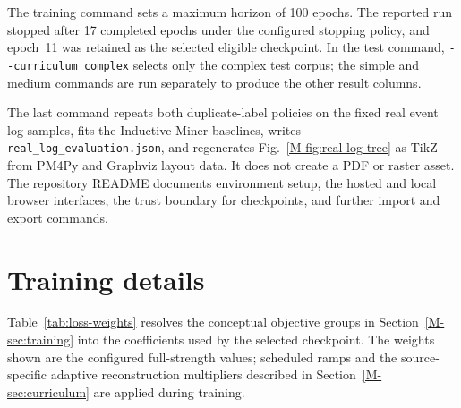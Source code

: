\documentclass[applsci,supfile,submit,pdftex,moreauthors]{Definitions/mdpi}
\begin{document}
The training command sets a maximum horizon of 100 epochs. The reported run stopped after 17 completed epochs under the configured stopping policy, and epoch~11 was retained as the selected eligible checkpoint. In the test command, \texttt{-{}-curriculum complex} selects only the complex test corpus; the simple and medium commands are run separately to produce the other result columns.

The last command repeats both duplicate-label policies on the fixed real event log samples, fits the Inductive Miner baselines, writes \texttt{real\_log\_evaluation.json}, and regenerates Fig.~\ref{M-fig:real-log-tree} as TikZ from PM4Py and Graphviz layout data. It does not create a PDF or raster asset. The repository README documents environment setup, the hosted and local browser interfaces, the trust boundary for checkpoints, and further import and export commands.

\FloatBarrier

\FloatBarrier

\section{Training details}\label{app:training-details}

Table~\ref{tab:loss-weights} resolves the conceptual objective groups in Section~\ref{M-sec:training} into the coefficients used by the selected checkpoint. The weights shown are the configured full-strength values; scheduled ramps and the source-specific adaptive reconstruction multipliers described in Section~\ref{M-sec:curriculum} are applied during training.
\end{document}
